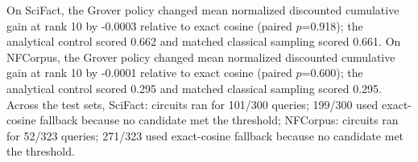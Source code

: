 On SciFact, the Grover policy changed mean normalized discounted cumulative gain at rank 10 by -0.0003 relative to exact cosine (paired $p$=0.918); the analytical control scored 0.662 and matched classical sampling scored 0.661. On NFCorpus, the Grover policy changed mean normalized discounted cumulative gain at rank 10 by -0.0001 relative to exact cosine (paired $p$=0.600); the analytical control scored 0.295 and matched classical sampling scored 0.295. Across the test sets, SciFact: circuits ran for 101/300 queries; 199/300 used exact-cosine fallback because no candidate met the threshold; NFCorpus: circuits ran for 52/323 queries; 271/323 used exact-cosine fallback because no candidate met the threshold.
